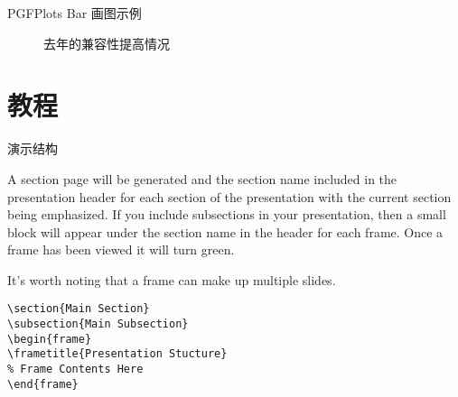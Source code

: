 \documentclass[newPxFont,sthlmFooter]{beamer}
\begin{document}
\begin{frame}{PGFPlots Bar 画图示例}
	\begin{figure}[h]
		\centering
		\caption{ 去年的兼容性提高情况 }
		\end{figure}
\end{frame}

%
%

\section{教程}


\begin{frame}[containsverbatim]{演示结构}

A section page will be generated and the section name included in the presentation header for each section of the presentation with the current section being emphasized.  If you include subsections in your presentation, then a small block will appear under the section name in the header for each frame.  Once a frame has been viewed it will turn green.

It's worth noting that a frame can make up multiple slides.

\begin{verbatim}
\section{Main Section}
\subsection{Main Subsection}
\begin{frame}
\frametitle{Presentation Stucture}
% Frame Contents Here
\end{frame}
\end{verbatim}
\end{frame}
\end{document}

